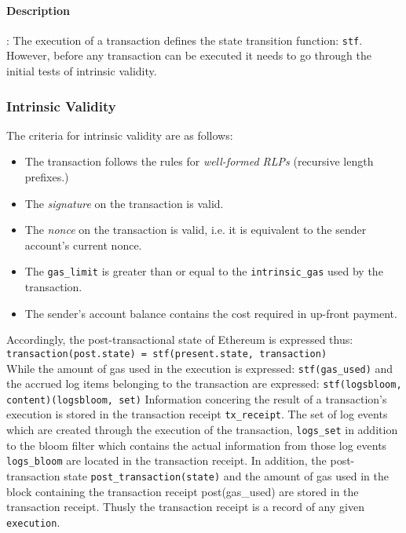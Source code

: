 \documentclass[10pt,a4paper,leqno,bibliography=totoc]{scrartcl}
\newenvironment{alphafootnotes}
{\par\edef\savedfootnotenumber{\number\value{footnote}}
\renewcommand{\thefootnote}{\alph{footnote}}
\setcounter{footnote}{0}}
{\par\setcounter{footnote}{\savedfootnotenumber}}
\begin{document}
\begin{alphafootnotes}
\begin{multicols*}{2}
			\paragraph{Description}: The execution of a transaction defines the state transition function: \texttt{stf}. However, before any transaction can be executed it needs to go through the initial tests of intrinsic validity. 
			\subsubsection{Intrinsic Validity}
				The criteria for intrinsic validity are as follows:
				\begin{itemize}
				\item The transaction follows the rules for \textsl{well-formed RLPs} (recursive length prefixes.)
				\item The \textsl{signature} on the transaction is valid.
				\item The \textsl{nonce} on the transaction is valid, i.e. it is equivalent to the sender account's current nonce.
				\item The \texttt{gas\_limit} is greater than or equal to the \texttt{intrinsic\_gas} used by the transaction.
				\item The sender's account balance contains the cost required in up-front payment.
				\end{itemize}

				Accordingly, the post-transactional state of Ethereum is expressed thus: 
				\\
				\texttt{transaction(post.state) = stf(present.state, transaction)}  
				\\
				While the amount of gas used in the execution is expressed: \texttt{stf(gas\_used)} and the accrued log items belonging to the transaction are expressed: \texttt{stf(logsbloom, content)(logsbloom, set)} Information concering the result of a transaction's execution is stored in the transaction receipt \texttt{tx\_receipt}. The set of log events which are created through the execution of the transaction, \texttt{logs\_set} in addition to the bloom filter which contains the actual information from those log events \texttt{logs\_bloom} are located in the transaction receipt. In addition, the post-transaction state \texttt{post\_transaction(state)} and the amount of gas used in the block containing the transaction receipt post(gas\_used) are stored in the transaction receipt. Thusly the transaction receipt is a record of any given \texttt{execution}. \par


\end{multicols*}
\end{alphafootnotes}
\end{document}
